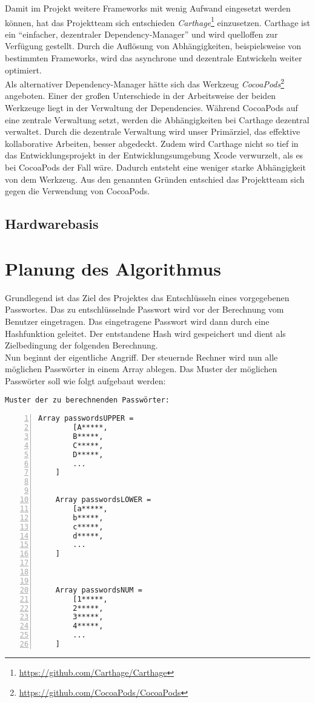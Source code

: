 Damit im Projekt weitere Frameworks mit wenig Aufwand eingesetzt werden können, hat das Projektteam sich entschieden \emph{Carthage}\footnote{\url{https://github.com/Carthage/Carthage}} einzusetzen. Carthage ist ein \enquote{einfacher, dezentraler Dependency-Manager} und wird quelloffen zur Verfügung gestellt. Durch die Auflösung von Abhängigkeiten, beispielsweise von bestimmten Frameworks, wird das asynchrone und dezentrale Entwickeln weiter optimiert. \\
Als alternativer Dependency-Manager hätte sich das Werkzeug \emph{CocoaPods}\footnote{\url{https://github.com/CocoaPods/CocoaPods}} angeboten. Einer der großen Unterschiede in der Arbeitsweise der beiden Werkzeuge liegt in der Verwaltung der Dependencies. Während CocoaPods auf eine zentrale Verwaltung setzt, werden die Abhängigkeiten bei Carthage dezentral verwaltet. Durch die dezentrale Verwaltung wird unser Primärziel, das effektive kollaborative Arbeiten, besser abgedeckt. Zudem wird Carthage nicht so tief in das Entwicklungsprojekt in der Entwicklungsumgebung Xcode verwurzelt, als es bei CocoaPods der Fall wäre. Dadurch entsteht eine weniger starke Abhängigkeit von dem Werkzeug. Aus den genannten Gründen entschied das Projektteam sich gegen die Verwendung von CocoaPods. 

\subsection{Hardwarebasis}

\section{Planung des Algorithmus}
\label{ideeBruteForce}
Grundlegend ist das Ziel des Projektes das Entschlüsseln eines vorgegebenen Passwortes. Das zu entschlüsselnde Passwort wird vor der Berechnung vom Benutzer eingetragen. Das eingetragene Passwort wird dann durch eine Hashfunktion geleitet. Der entstandene Hash wird gespeichert und dient als Zielbedingung der folgenden Berechnung. \\
Nun beginnt der eigentliche Angriff. Der steuernde Rechner wird nun alle möglichen Passwörter in einem Array ablegen. Das Muster der möglichen Passwörter soll wie folgt aufgebaut werden: 
\newpage

\texttt{Muster der zu berechnenden Passwörter:}
\begin{lstlisting}[basicstyle=\ttfamily,numbers=left,numberstyle=\footnotesize\ttfamily,backgroundcolor=\color{sourcegray}]
	Array passwordsUPPER = 
		[A*****,
	 	B*****,
	 	C*****,
	 	D*****,
	 	...
	]
	
	
	Array passwordsLOWER = 
		[a*****,
	 	b*****,
	 	c*****,
	 	d*****,
		...
	]
	
	

	Array passwordsNUM = 
		[1*****,
	 	2*****,
	 	3*****,
	 	4*****,
		...
	]
\end{lstlisting}
\newpage

